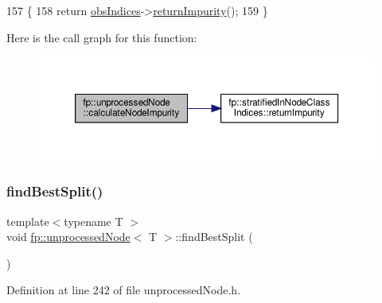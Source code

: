 \begin{DoxyCode}
157                                                     \{
158                     \textcolor{keywordflow}{return} \hyperlink{classfp_1_1unprocessedNode_aea171244695a3a099061188a9553e525}{obsIndices}->\hyperlink{classfp_1_1stratifiedInNodeClassIndices_a044392c507fe54073f55f5ae6aceac5f}{returnImpurity}();
159                 \}
\end{DoxyCode}
Here is the call graph for this function\+:\nopagebreak
\begin{figure}[H]
\begin{center}
\leavevmode
\includegraphics[width=350pt]{classfp_1_1unprocessedNode_a0278b4dd8d905d38d75ced9a95839a12_cgraph}
\end{center}
\end{figure}
\mbox{\label{classfp_1_1unprocessedNode_a5fea1583d2250e14470d92568b57e60c}} 
\subsubsection{\texorpdfstring{find\+Best\+Split()}{findBestSplit()}}
{\footnotesize\ttfamily template$<$typename T $>$ \\
void \hyperlink{classfp_1_1unprocessedNode}{fp\+::unprocessed\+Node}$<$ T $>$\+::find\+Best\+Split (\begin{DoxyParamCaption}{ }\end{DoxyParamCaption})\hspace{0.3cm}{\ttfamily [inline]}}



Definition at line 242 of file unprocessed\+Node.\+h.


